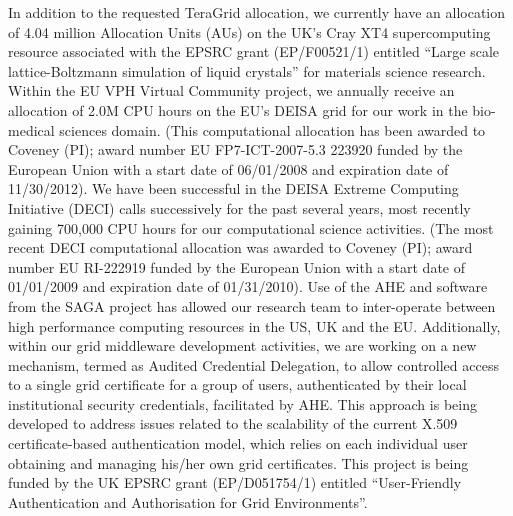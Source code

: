 In addition to the requested TeraGrid allocation, we currently have an allocation of 4.04 million Allocation Units (AUs) on the UK's Cray XT4 supercomputing resource associated with the EPSRC grant (EP/F00521/1) entitled ``Large scale lattice-Boltzmann simulation of liquid crystals'' for materials science research. Within the EU VPH Virtual Community project, we annually receive an allocation of 2.0M CPU hours on the EU's DEISA grid for our work in the bio-medical sciences domain.  (This computational allocation has been awarded to Coveney (PI); award number EU FP7-ICT-2007-5.3 223920 funded by the European Union with a start date of 06/01/2008 and expiration date of 11/30/2012).  We have been successful in the DEISA Extreme Computing Initiative (DECI) calls successively for the past several years, most recently gaining 700,000 CPU hours for our computational science activities.  (The most recent DECI computational allocation was awarded to Coveney (PI); award number EU RI-222919 funded by the European Union with a start date of 01/01/2009 and expiration date of 01/31/2010).  Use of the AHE and software from the SAGA project has allowed our research team to inter-operate between high performance computing resources in the US, UK and the EU.  Additionally, within our grid middleware development activities, we are working on
a new mechanism, termed as Audited Credential Delegation, to allow controlled access to a single grid certificate for a group of users, authenticated by their local institutional security credentials, facilitated by AHE. This approach is being developed to address issues related to the scalability of the current X.509 certificate-based authentication model, which relies on each individual user obtaining and managing his/her own grid certificates. This project is being funded by the UK EPSRC grant (EP/D051754/1) entitled ``User-Friendly Authentication and Authorisation for Grid Environments''.

\begin{comment}	
\emph{We need to ensure we address point raised last time, by citing 
reciprocal activities in UK/EU, and equivalnet utilization of DEISA REOSOURCEes.}
We have an allocation of X million AUs on UK's Cray XT4 supercomputer associated
with the UK EPSRC Grant(LSLBLC NO.) which
will support the projects within the bio-materials science domain. We plan
to perform complementary activities on EU's DEISA grid 
in the biomedicine domain, where the work is
supported by EU FP6 and FP7 funding and the new UCL-Yale initiative. 
We have been successful in the DEISA Extreme Computing Initiative (DECI)
calls successively for the past two years in gaining access to some of the
biggest supercomputers in the EU. Use of SAGA and AHE 3.0 will allow us to
seamlessly inter-operate between high performance computing resources in the
US and EU.
\end{comment} 
